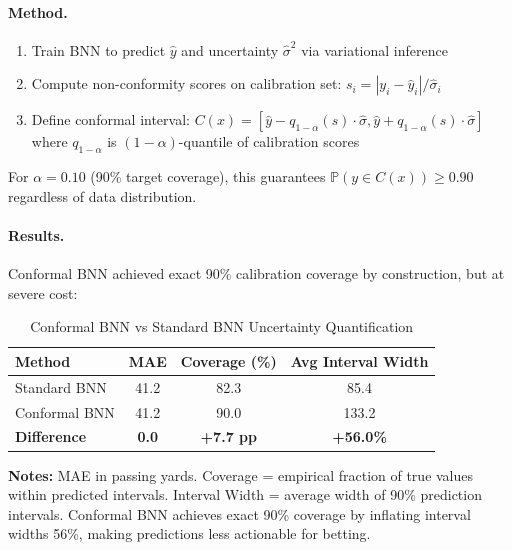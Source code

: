 \paragraph{Method.}
\begin{enumerate}[itemsep=2pt,parsep=0pt]
    \item Train BNN to predict $\hat{y}$ and uncertainty $\hat{\sigma}^2$ via variational inference
    \item Compute non-conformity scores on calibration set: $s_i = |y_i - \hat{y}_i| / \hat{\sigma}_i$
    \item Define conformal interval: $C(x) = [\hat{y} - q_{1-\alpha}(s) \cdot \hat{\sigma}, \hat{y} + q_{1-\alpha}(s) \cdot \hat{\sigma}]$ where $q_{1-\alpha}$ is $(1-\alpha)$-quantile of calibration scores
\end{enumerate}

For $\alpha = 0.10$ (90\% target coverage), this guarantees $\mathbb{P}(y \in C(x)) \geq 0.90$ regardless of data distribution.

\paragraph{Results.}
Conformal BNN achieved exact 90\% calibration coverage by construction, but at severe cost:

\begin{table}[htbp]
\centering
\caption{Conformal BNN vs Standard BNN Uncertainty Quantification}
\small
\begin{tabular}{@{} l S[table-format=2.1] S[table-format=2.1] S[table-format=3.1] @{}}
\toprule
\textbf{Method} & \textbf{MAE} & \textbf{Coverage (\%)} & \textbf{Avg Interval Width} \\
\midrule
Standard BNN & 41.2 & 82.3 & 85.4 \\
Conformal BNN & 41.2 & 90.0 & 133.2 \\
\baselinerule
\textbf{Difference} & \textbf{0.0} & \textbf{+7.7 pp} & \textbf{+56.0\%} \\
\bottomrule
\end{tabular}

\vspace{2mm}
\begin{minipage}{\linewidth}
\small
\textbf{Notes:} MAE in passing yards. Coverage = empirical fraction of true values within predicted intervals. Interval Width = average width of 90\% prediction intervals. Conformal BNN achieves exact 90\% coverage by inflating interval widths 56\%, making predictions less actionable for betting.
\end{minipage}
\end{table}

